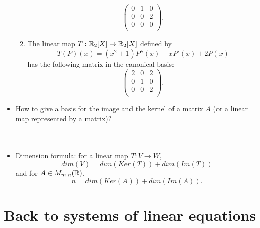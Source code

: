 \begin{itemize}
\begin{enumerate}
\[\begin{pmatrix}
0 & 1 & 0 \\
0 & 0 & 2 \\
0 & 0 & 0 \\
\end{pmatrix}.\]
\item The linear map $T: \mathbb R_2[X]\rightarrow \mathbb R_2[X]$ defined by 
\[T(P)(x) = (x^2+1)P''(x)- xP'(x) + 2P(x)\] 
has the following matrix in the canonical basis:
\[\begin{pmatrix}  
2 & 0 & 2 \\
0 & 1 & 0 \\
0 & 0 & 2 \\
\end{pmatrix}.\]
\end{enumerate}
\item How to give a basis for the image and the kernel of a matrix $A$ (or a linear map represented by a matrix)?\\

\\
\\
\item Dimension formula: for a linear map $T: V \rightarrow W$,
\[ dim(V) =  dim (Ker (T)) + dim(Im(T))\]
and for $A\in M_{m,n}(\mathbb R)$,
\[ n =  dim (Ker (A)) + dim(Im(A)).\]
\end{itemize}

\section*{Back to systems of linear equations}

